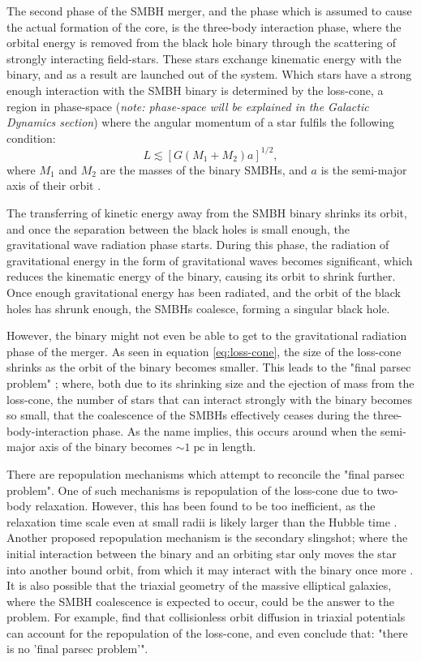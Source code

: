 \documentclass[english, oneside]{HYgradu}
\begin{document}
The second phase of the SMBH merger, and the phase which is assumed to cause the actual formation of the core, is the three-body interaction phase, where the orbital energy is removed from the black hole binary through the scattering of strongly interacting field-stars. These stars exchange kinematic energy with the binary, and as a result are launched out of the system. Which stars have a strong enough interaction with the SMBH binary is determined by the loss-cone, a region in phase-space (\textit{note: phase-space will be explained in the Galactic Dynamics section}) where the angular momentum of a star fulfils the following condition:
\begin{equation}
L \lesssim \left[ G(M_1 + M_2) a \right]^{1/2}, \label{eq:loss-cone}
\end{equation}
where $M_1$ and $M_2$ are the masses of the binary SMBHs, and $a$ is the semi-major axis of their orbit \citep{BinneyTremaine}. 

The transferring of kinetic energy away from the SMBH binary shrinks its orbit, and once the separation between the black holes is small enough, the gravitational wave radiation phase starts. During this phase, the radiation of gravitational energy in the form of gravitational waves becomes significant, which reduces the kinematic energy of the binary, causing its orbit to shrink further. Once enough gravitational energy has been radiated, and the orbit of the black holes has shrunk enough, the SMBHs coalesce, forming a singular black hole. 

However, the binary might not even be able to get to the gravitational radiation phase of the merger. As seen in equation \ref{eq:loss-cone}, the size of the loss-cone shrinks as the orbit of the binary becomes smaller. This leads to the "final parsec problem" \citep{Milosavljevic2003}; where, both due to its shrinking size and the ejection of mass from the loss-cone, the number of stars that can interact strongly with the binary becomes so small, that the coalescence of the SMBHs effectively ceases during the three-body-interaction phase. As the name implies, this occurs around when the semi-major axis of the binary becomes $\sim 1 \; \mathrm{pc}$ in length.

There are repopulation mechanisms which attempt to reconcile the "final parsec problem". One of such mechanisms is repopulation of the loss-cone due to two-body relaxation. However, this has been found to be too inefficient, as the relaxation time scale even at small radii is likely larger than the Hubble time \citep{Milosavljevic2001}. Another proposed repopulation mechanism is the secondary slingshot; where the initial interaction between the binary and an orbiting star only moves the star into another bound orbit, from which it may interact with the binary once more \citep{MerrittBook}. It is also possible that the triaxial geometry of the massive elliptical galaxies, where the SMBH coalescence is expected to occur, could be the answer to the problem. For example, \cite{Gualandris2017} find that collisionless orbit diffusion in triaxial potentials can account for the repopulation of the loss-cone, and even conclude that: "there is no 'final parsec problem'".
\end{document}
